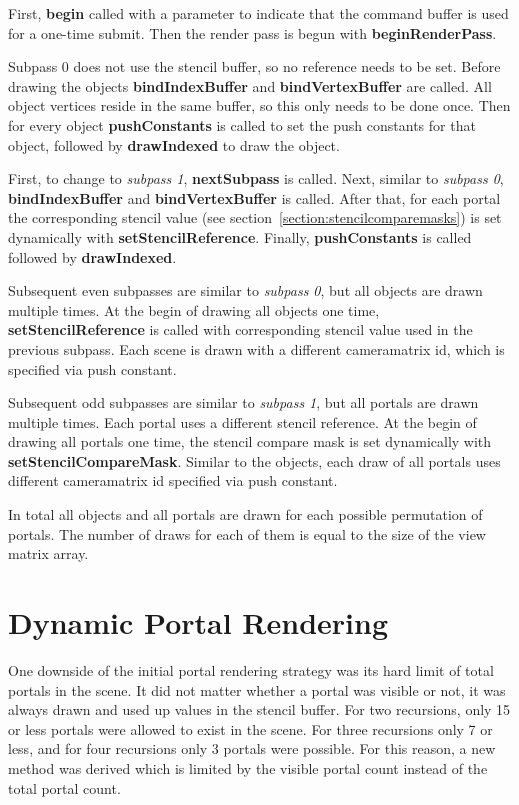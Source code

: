 First, \textbf{begin} called with a parameter to indicate that the command buffer is used for a one-time submit. Then the render pass is begun with \textbf{beginRenderPass}.


Subpass 0 does not use the stencil buffer, so no reference needs to be set. Before drawing the objects \textbf{bindIndexBuffer} and \textbf{bindVertexBuffer} are called. All object vertices reside in the same buffer, so this only needs to be done once. Then for every object \textbf{pushConstants} is called to set the push constants for that object, followed by \textbf{drawIndexed} to draw the object. 

First, to change to \textit{subpass 1}, \textbf{nextSubpass} is called. Next, similar to \textit{subpass 0}, \textbf{bindIndexBuffer} and \textbf{bindVertexBuffer} is called. After that, for each portal the corresponding stencil value (see section~\ref{section:stencilcomparemasks}) is set dynamically with \textbf{setStencilReference}. Finally, \textbf{pushConstants} is called followed by \textbf{drawIndexed}.

Subsequent even subpasses are similar to \textit{subpass 0}, but all objects are drawn multiple times. At the begin of drawing all objects one time, \textbf{setStencilReference} is called with corresponding stencil value used in the previous subpass. Each scene is drawn with a different \gls{cameramatrix} id, which is specified via push constant. 

Subsequent odd subpasses are similar to \textit{subpass 1}, but all portals are drawn multiple times. Each portal uses a different stencil reference.  At the begin of drawing all portals one time, the stencil compare mask is set dynamically with \textbf{setStencilCompareMask}. Similar to the objects, each draw of all portals uses different \gls{cameramatrix} id specified via push constant. 

In total all objects and all portals are drawn for each possible permutation of portals. The number of draws for each of them is equal to the size of the view matrix array.


\section{Dynamic Portal Rendering}
One downside of the initial portal rendering strategy was its hard limit of total portals in the scene. It did not matter whether a portal was visible or not, it was always drawn and used up values in the stencil buffer. For two recursions, only 15 or less portals were allowed to exist in the scene. For three recursions only 7 or less, and for four recursions only 3 portals were possible. For this reason, a new method was derived which is limited by the visible portal count instead of the total portal count. 

